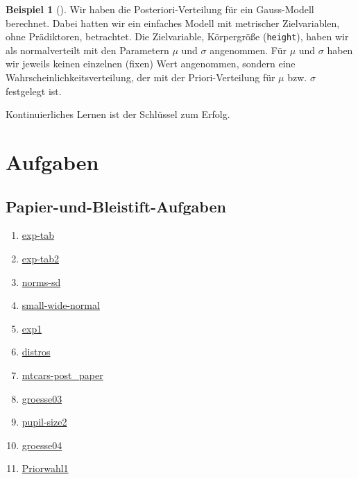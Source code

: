 \documentclass[
  ngerman,
  letterpaper,
  twoside,
  open=any]{scrbook}
\providecommand{\tightlist}{%
  \setlength{\itemsep}{0pt}\setlength{\parskip}{0pt}}\usepackage{longtable,booktabs,array}
\theoremstyle{definition}
\newtheorem{example}{Beispiel}[chapter]
\theoremstyle{plain}
\theoremstyle{definition}
\theoremstyle{definition}
\theoremstyle{remark}
\begin{document}
\begin{example}[]
Wir haben die Posteriori-Verteilung für ein Gauss-Modell berechnet.
Dabei hatten wir ein einfaches Modell mit metrischer Zielvariablen, ohne
Prädiktoren, betrachtet. Die Zielvariable, Körpergröße
(\texttt{height}), haben wir als normalverteilt mit den Parametern
\(\mu\) und \(\sigma\) angenommen. Für \(\mu\) und \(\sigma\) haben wir
jeweils keinen einzelnen (fixen) Wert angenommen, sondern eine
Wahrscheinlichkeitsverteilung, der mit der Priori-Verteilung für \(\mu\)
bzw. \(\sigma\) festgelegt ist.

\begin{tcolorbox}[enhanced jigsaw, arc=.35mm, bottomrule=.15mm, bottomtitle=1mm, breakable, colback=white, colbacktitle=quarto-callout-important-color!10!white, colframe=quarto-callout-important-color-frame, coltitle=black, left=2mm, leftrule=.75mm, opacityback=0, opacitybacktitle=0.6, rightrule=.15mm, title=\textcolor{quarto-callout-important-color}{\faExclamation}\hspace{0.5em}{Wichtig}, titlerule=0mm, toprule=.15mm, toptitle=1mm]

Kontinuierliches Lernen ist der Schlüssel zum Erfolg.

\end{tcolorbox}

\section{Aufgaben}\label{aufgaben-7}

\subsection{Papier-und-Bleistift-Aufgaben}\label{papier-und-bleistift-aufgaben-2}

\begin{enumerate}
\def\labelenumi{\arabic{enumi}.}
\tightlist
\item
  \href{https://datenwerk.netlify.app/posts/exp-tab/}{exp-tab}
\item
  \href{https://datenwerk.netlify.app/posts/exp-tab2/}{exp-tab2}
\item
  \href{https://datenwerk.netlify.app/posts/norms-sd/}{norms-sd}
\item
  \href{https://datenwerk.netlify.app/posts/small-wide-normal/}{small-wide-normal}
\item
  \href{https://datenwerk.netlify.app/posts/exp1/}{exp1}
\item
  \href{https://datenwerk.netlify.app/posts/distros/}{distros}
\item
  \href{https://datenwerk.netlify.app/posts/mtcars-post_paper/}{mtcars-post\_paper}
\item
  \href{https://datenwerk.netlify.app/posts/groesse03/}{groesse03}
\item
  \href{https://datenwerk.netlify.app/posts/pupil-size2/}{pupil-size2}
\item
  \href{https://datenwerk.netlify.app/posts/groesse04/}{groesse04}
\item
  \href{https://datenwerk.netlify.app/posts/Priorwahl1/Priorwahl1.html}{Priorwahl1}
\end{enumerate}


\end{example}
\end{document}
